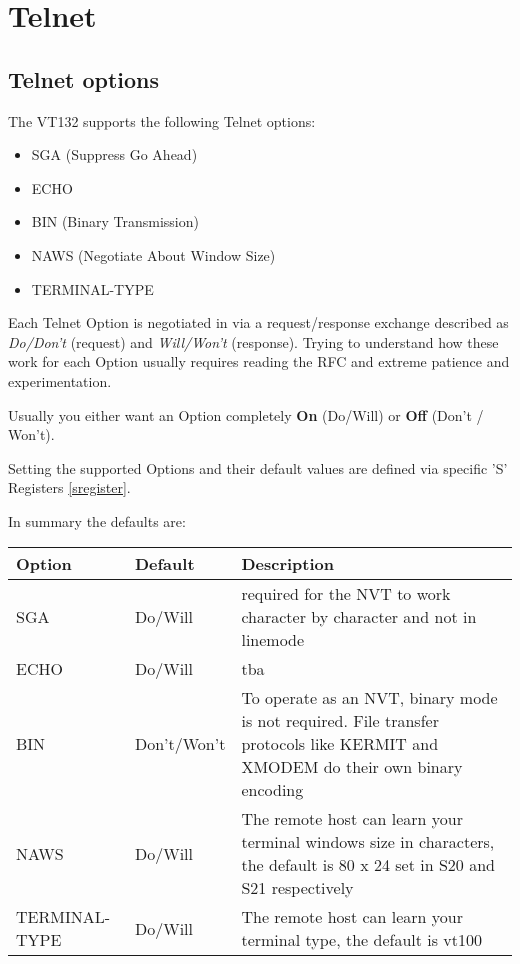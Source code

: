 
\newpage
\section{Telnet}

\subsection{Telnet options}

The VT132 supports the following Telnet options:

\begin{itemize}
 \item SGA (Suppress Go Ahead)
 \item ECHO
 \item BIN (Binary Transmission)
 \item NAWS (Negotiate About Window Size)
 \item TERMINAL-TYPE
\end{itemize}

Each Telnet Option is negotiated in via a request/response exchange described as \textit{Do/Don't} (request) and \textit{Will/Won't} (response). Trying to understand how these work for each Option usually requires reading the RFC and extreme patience and experimentation.

Usually you either want an Option completely \textbf{On} (Do/Will) or \textbf{Off} (Don't / Won't).

Setting the supported Options and their default values are defined via specific 'S' Registers \vref{sregister}.

In summary the defaults are:

\begin{tabular}{p{6em} | p{5.5em} | p{}}
\hline
\textbf{Option}	& \textbf{Default}	& \textbf{Description} \\
\hline
SGA				& Do/Will		& required for the NVT to work character by character and not in linemode \\
ECHO			& Do/Will		& tba \\
BIN				& Don't/Won't	& To operate as an NVT, binary mode is not required. File transfer protocols like KERMIT and XMODEM do their own binary encoding \\
NAWS			& Do/Will		& The remote host can learn your terminal windows size in characters, the default is 80 x 24 set in S20 and S21 respectively \\
TERMINAL-TYPE	& Do/Will		& The remote host can learn your terminal type, the default is vt100 \\
\hline
\end{tabular}
\bigskip

